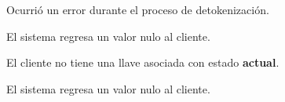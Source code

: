 {  \begin{trayectoriaAlternativa}
    {Ocurrió un error durante el proceso de detokenización.}

    \item El sistema regresa un valor nulo al cliente.

  \end{trayectoriaAlternativa}

  \begin{trayectoriaAlternativa}
    {El cliente no tiene una llave asociada con estado \textbf{actual}.}

    \item El sistema regresa un valor nulo al cliente.

  \end{trayectoriaAlternativa}
}
